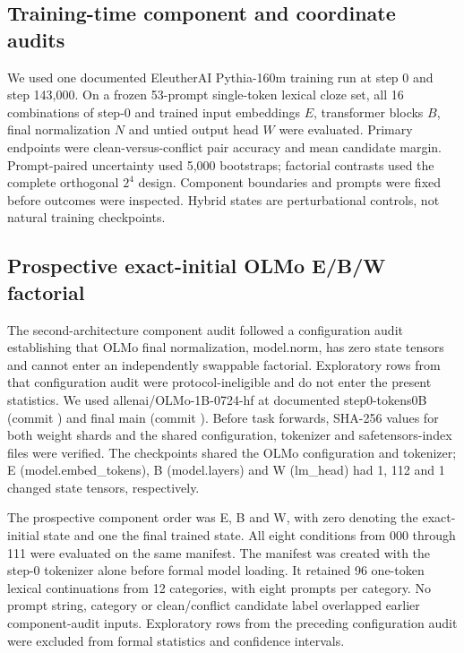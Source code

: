 \documentclass[12pt]{article}
\newcommand{\codeid}[1]{{\ttfamily\footnotesize #1}}
\begin{document}
\subsection*{Training-time component and coordinate audits}

We used one documented EleutherAI Pythia-160m training run at step 0 and step 143,000. On a frozen 53-prompt single-token lexical cloze set, all 16 combinations of step-0 and trained input embeddings \(E\), transformer blocks \(B\), final normalization \(N\) and untied output head \(W\) were evaluated. Primary endpoints were clean-versus-conflict pair accuracy and mean candidate margin. Prompt-paired uncertainty used 5,000 bootstraps; factorial contrasts used the complete orthogonal \(2^4\) design. Component boundaries and prompts were fixed before outcomes were inspected. Hybrid states are perturbational controls, not natural training checkpoints.

\subsection*{Prospective exact-initial OLMo E/B/W factorial}

The second-architecture component audit followed a configuration audit establishing that OLMo final normalization, \codeid{model.norm}, has zero state tensors and cannot enter an independently swappable factorial. Exploratory rows from that configuration audit were protocol-ineligible and do not enter the present statistics. We used \codeid{allenai/OLMo-1B-0724-hf} at documented \codeid{step0-tokens0B} (commit \codeid{}) and final \codeid{main} (commit \codeid{}). Before task forwards, SHA-256 values for both weight shards and the shared configuration, tokenizer and safetensors-index files were verified. The checkpoints shared the OLMo configuration and tokenizer; E (\codeid{model.embed\_tokens}), B (\codeid{model.layers}) and W (\codeid{lm\_head}) had 1, 112 and 1 changed state tensors, respectively.

The prospective component order was E, B and W, with zero denoting the exact-initial state and one the final trained state. All eight conditions from \codeid{000} through \codeid{111} were evaluated on the same manifest. The manifest was created with the step-0 tokenizer alone before formal model loading. It retained 96 one-token lexical continuations from 12 categories, with eight prompts per category. No prompt string, category or clean/conflict candidate label overlapped earlier component-audit inputs. Exploratory rows from the preceding configuration audit were excluded from formal statistics and confidence intervals.
\end{document}
